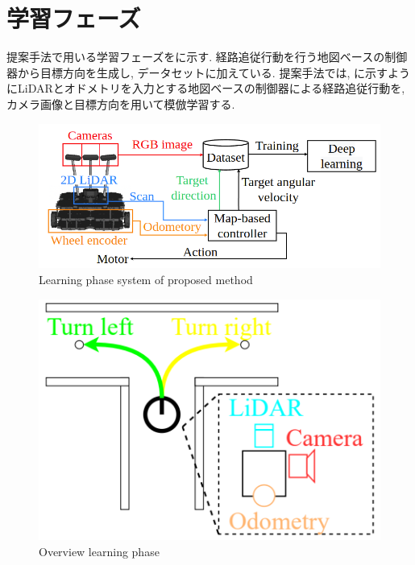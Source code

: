 
\section{学習フェーズ}
提案手法で用いる学習フェーズをに示す. 経路追従行動を行う地図ベースの制御器から目標方向を生成し, データセットに加えている. 提案手法では, に示すようにLiDARとオドメトリを入力とする地図ベースの制御器による経路追従行動を, カメラ画像と目標方向を用いて模倣学習する.

\begin{figure}[hbtp]
  \centering
 \includegraphics[keepaspectratio, scale=0.45]
      {images/suggest_learning_sys.png}
 \caption{Learning phase system of proposed method}
 \label{Fig:suggest_learning_sys}
\end{figure}

\begin{figure}[hbtp]
  \centering
 \includegraphics[keepaspectratio, scale=0.6]
      {images/overview.png}
 \caption{Overview learning phase}
 \label{Fig:overview}
\end{figure}

\newpage
